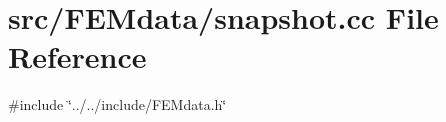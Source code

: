 \section{src/\+F\+E\+Mdata/snapshot.cc File Reference}
\label{snapshot_8cc}
{\ttfamily \#include \char`\"{}../../include/\+F\+E\+Mdata.\+h\char`\"{}}\newline
